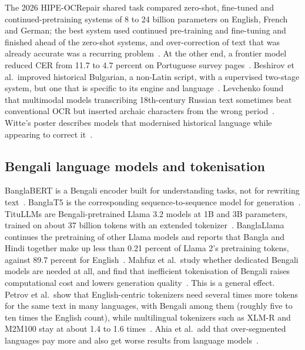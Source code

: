 \documentclass[conference]{IEEEtran}
\begin{document}
The 2026 HIPE-OCRepair shared task compared zero-shot, fine-tuned and continued-pretraining systems of 8 to 24 billion parameters on English, French and German; the best system used continued pre-training and fine-tuning and finished ahead of the zero-shot systems, and over-correction of text that was already accurate was a recurring problem~\cite{ehrmann2026hipeocrepair}. At the other end, a frontier model reduced CER from 11.7 to 4.7 percent on Portuguese survey pages~\cite{viana2026reframing}. Beshirov et al.\ improved historical Bulgarian, a non-Latin script, with a supervised two-stage system, but one that is specific to its engine and language~\cite{beshirov2025bulgarian}. Levchenko found that multimodal models transcribing 18th-century Russian text sometimes beat conventional OCR but inserted archaic characters from the wrong period~\cite{levchenko2025historical}. Witte's poster describes models that modernised historical language while appearing to correct it~\cite{witte2025postocr}.

\subsection{Bengali language models and tokenisation}
BanglaBERT is a Bengali encoder built for understanding tasks, not for rewriting text~\cite{bhattacharjee2022banglabert}. BanglaT5 is the corresponding sequence-to-sequence model for generation~\cite{bhattacharjee2023banglat5}. TituLLMs are Bengali-pretrained Llama 3.2 models at 1B and 3B parameters, trained on about 37 billion tokens with an extended tokenizer~\cite{nahin2025titullms}. BanglaLlama continues the pretraining of other Llama models and reports that Bangla and Hindi together make up less than 0.21 percent of Llama 2's pretraining tokens, against 89.7 percent for English~\cite{zehady2026banglallama}. Mahfuz et al.\ study whether dedicated Bengali models are needed at all, and find that inefficient tokenisation of Bengali raises computational cost and lowers generation quality~\cite{mahfuz2025toolate}. This is a general effect. Petrov et al.\ show that English-centric tokenizers need several times more tokens for the same text in many languages, with Bengali among them (roughly five to ten times the English count), while multilingual tokenizers such as XLM-R and M2M100 stay at about 1.4 to 1.6 times~\cite{petrov2023tokenizer}. Ahia et al.\ add that over-segmented languages pay more and also get worse results from language models~\cite{ahia2023cost}.
\end{document}
